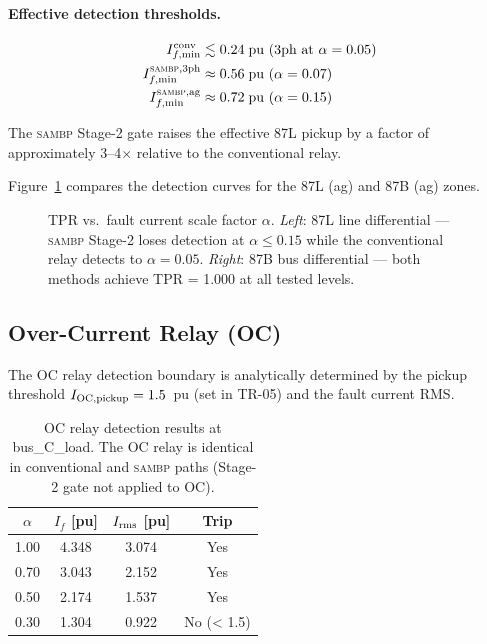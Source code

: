 \documentclass[12pt,a4paper]{article}
\newcommand{\SAMBP}{\textsc{sambp}}
\begin{document}
\paragraph{Effective detection thresholds.}
\begin{align*}
  I_{f,\rm min}^{\rm conv}  &\lesssim 0.24\;\text{pu (3ph at }\alpha=0.05\text{)}\\
  I_{f,\rm min}^{\SAMBP,\rm 3ph} &\approx 0.56\;\text{pu (}\alpha=0.07\text{)}\\
  I_{f,\rm min}^{\SAMBP,\rm ag} &\approx 0.72\;\text{pu (}\alpha=0.15\text{)}
\end{align*}

The \SAMBP{} Stage-2 gate raises the effective 87L pickup by a factor
of approximately 3--4$\times$ relative to the conventional relay.

Figure~\ref{fig:margins} compares the detection curves for the 87L
(ag) and 87B (ag) zones.

\begin{figure}[ht]
  \centering
  
  \caption{TPR vs.\ fault current scale factor $\alpha$.
    \emph{Left}: 87L line differential — \SAMBP{} Stage-2 loses
    detection at $\alpha \leq 0.15$ while the conventional relay
    detects to $\alpha = 0.05$.
    \emph{Right}: 87B bus differential — both methods achieve
    TPR = 1.000 at all tested levels.}
  \label{fig:margins}
\end{figure}

\subsection{Over-Current Relay (OC)}

The OC relay detection boundary is analytically determined by the pickup
threshold $I_{\rm OC,pickup} = 1.5$~pu (set in TR-05) and the fault
current RMS.

\begin{table}[ht]
\centering
\caption{OC relay detection results at bus\_C\_load.
  The OC relay is identical in conventional and \SAMBP{} paths
  (Stage-2 gate not applied to OC).}
\label{tab:oc}
\begin{tabular}{cccc}
\toprule
$\alpha$ & $I_f$ [pu] & $I_{\rm rms}$ [pu] & Trip \\
\midrule
1.00 & 4.348 & 3.074 & Yes \\
0.70 & 3.043 & 2.152 & Yes \\
0.50 & 2.174 & 1.537 & Yes \\
0.30 & 1.304 & 0.922 & \textcolor{warnred}{No (< 1.5)} \\
\bottomrule
\end{tabular}
\end{table}
\end{document}
